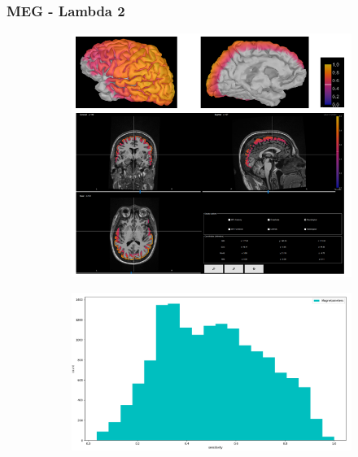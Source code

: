 \documentclass{beamer}
\numberwithin{figure}{section}
\numberwithin{equation}{section}
\begin{document}
\section{}
\begin{frame}
 \frametitle{MEG - Lambda 2 }
  

 	\begin{figure}[h]
        \begin{subfigure}[h]{0.53\linewidth} 
            \includegraphics[width=\linewidth]{pictures/meg2}
            \label{fig:rdf_graph}
        \end{subfigure}       
        \begin{subfigure}[h]{0.45\linewidth} 
            \includegraphics[width=\linewidth]{pictures/HISTmeg1.png}
            \label{fig:rdfs_graph}
        \end{subfigure}
    \end{figure}

  
\end{frame}
\end{document}
